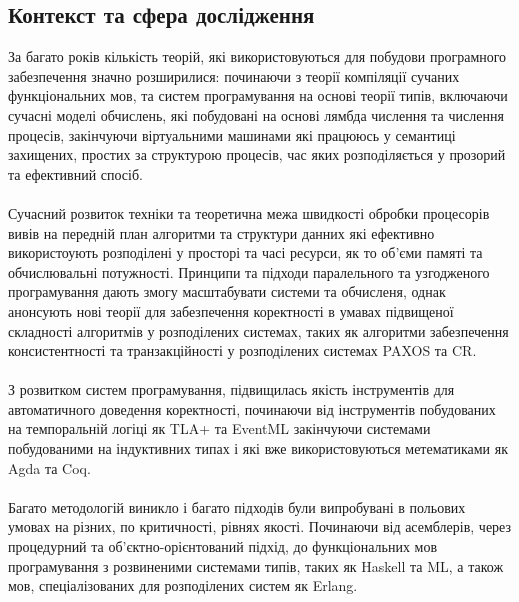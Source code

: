 \documentclass[11pt,oneside]{article}
\begin{document}
\newpage
\subsection{Контекст та сфера дослідження}

\vspace{0.5cm}
   За багато років кількість теорій, які використовуються для побудови програмного забезпечення значно розширилися:
   починаючи з теорії компіляції сучаних функціональних мов, та систем програмування на основі теорії типів,
   включаючи сучасні моделі обчислень, які побудовані на основі лямбда числення та числення процесів, закінчуючи віртуальними
   машинами які працююсь у семантиці захищених, простих за структурою процесів, час яких розподіляється
   у прозорий та ефективний спосіб.

   \paragraph{}
   Сучасний розвиток техніки та теоретична межа швидкості обробки процесорів вивів на передній план алгоритми та структури
   данних які ефективно використоують розподілені у просторі та часі ресурси, як то об’єми памяті та обчислювальні потужності.
   Принципи та підходи паралельного та узгодженого програмування дають змогу масштабувати системи та обчисленя, однак
   анонсують нові теорії для забезпечення коректності в умавах підвищеної складності алгоритмів у розподілених системах,
   таких як алгоритми забезпечення консистентності та транзакційності у розподілених системах PAXOS та CR.

   \paragraph{}
   З розвитком систем програмування, підвищилась якість інструментів для автоматичного доведення коректності,
   починаючи від інструментів побудованих на темпоральній логіці як TLA+ та EventML закінчуючи системами
   побудованими на індуктивних типах і які вже використовуються метематиками як Agda та Coq.

   \paragraph{}
   Багато методологій виникло і багато підходів були випробувані в польових умовах на різних, по критичності, рівнях якості.
   Починаючи від асемблерів, через процедурний та об’єктно-орієнтований підхід, до функціональних мов програмування
   з розвиненими системами типів, таких як Haskell та ML, а також мов, спеціалізованих для розподілених систем як Erlang.
\end{document}

